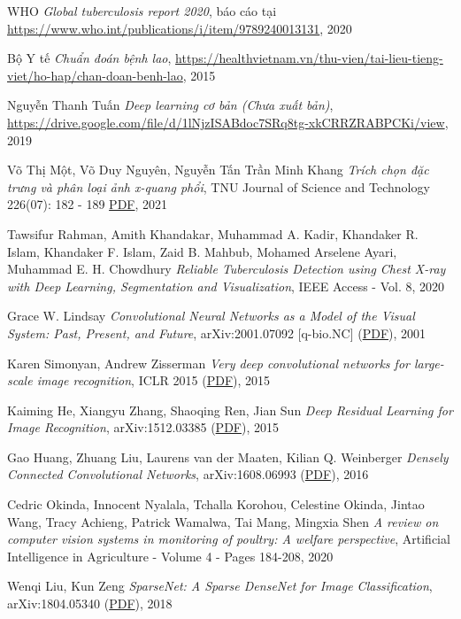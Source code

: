 \newpage
{}
\begin{thebibliography}{99}
	 WHO {\it Global tuberculosis report 2020}, báo cáo tại \href{https://www.who.int/publications/i/item/9789240013131}{ https://www.who.int/publications/i/item/9789240013131}, 2020
	
	 Bộ Y tế {\it Chuẩn đoán bệnh lao}, \href{https://healthvietnam.vn/thu-vien/tai-lieu-tieng-viet/ho-hap/chan-doan-benh-lao}{https://healthvietnam.vn/thu-vien/tai-lieu-tieng-viet/ho-hap/chan-doan-benh-lao}, 2015
	
	
	 Nguyễn Thanh Tuấn {\it Deep learning cơ bản (Chưa xuất bản)}, \href{https://drive.google.com/file/d/1lNjzISABdoc7SRq8tg-xkCRRZRABPCKi/view}{https://drive.google.com/file/d/1lNjzISABdoc7SRq8tg-xkCRRZRABPCKi/view}, 2019
	
	 Võ Thị Một, Võ Duy Nguyên, Nguyễn Tấn Trần Minh Khang {\it Trích chọn đặc trưng và phân loại ảnh x-quang phổi}, TNU Journal of Science and Technology 226(07): 182 - 189 {\href{http://jst.tnu.edu.vn/jst/article/viewFile/3974/pdf}{PDF}}, 2021
	
	 Tawsifur Rahman, Amith Khandakar, Muhammad A. Kadir, Khandaker R. Islam, Khandaker F. Islam, Zaid B. Mahbub, Mohamed Arselene Ayari, Muhammad E. H. Chowdhury {\it Reliable Tuberculosis Detection using Chest X-ray with Deep Learning, Segmentation and Visualization}, IEEE Access - Vol. 8, 2020
	
	 Grace W. Lindsay {\it Convolutional Neural Networks as a Model of the Visual System: Past, Present, and Future}, 	arXiv:2001.07092 [q-bio.NC] (\href{https://arxiv.org/ftp/arxiv/papers/2001/2001.07092.pdf}{PDF}), 2001
	
	 Karen Simonyan, Andrew Zisserman {\it Very deep convolutional networks for large-scale image recognition}, ICLR 2015 (\href{https://arxiv.org/pdf/1409.1556.pdf}{PDF}), 2015
	
	 Kaiming He, Xiangyu Zhang, Shaoqing Ren, Jian Sun {\it Deep Residual Learning for Image Recognition}, arXiv:1512.03385 (\href{https://arxiv.org/pdf/1512.03385.pdf}{PDF}), 2015	
	
	 Gao Huang, Zhuang Liu, Laurens van der Maaten, Kilian Q. Weinberger {\it Densely Connected Convolutional Networks}, arXiv:1608.06993 (\href{https://arxiv.org/pdf/1608.06993.pdf}{PDF}), 2016 
	  
	 Cedric Okinda, Innocent Nyalala, Tchalla Korohou, Celestine Okinda, Jintao Wang, Tracy Achieng, Patrick Wamalwa, Tai Mang, Mingxia Shen {\it A review on computer vision systems in monitoring of poultry: A welfare perspective}, Artificial Intelligence in Agriculture - Volume 4 - Pages 184-208, 2020
	
	 Wenqi Liu, Kun Zeng {\it SparseNet: A Sparse DenseNet for Image Classification}, arXiv:1804.05340 (\href{https://arxiv.org/pdf/1804.05340.pdf}{PDF}), 2018  
\end{thebibliography}
